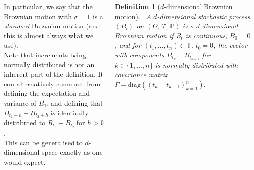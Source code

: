 \documentclass{tikzposter} %
\newtheorem{lemma}[theorem]{Lemma}
\newtheorem{definition}{Definition}
\begin{document}
\begin{columns}
{    In particular, we say that the Brownian motion with $\sigma = 1$ is a \emph{standard} Brownian motion (and this is almost always what we use). \\

    Note that increments being normally distributed is not an inherent part of the definition. It can alternatively come out from defining the expectation and variance of $B_{1}$, and defining that $B_{t_{1}+h} - B_{t_{2}+h}$ is identically distributed to $B_{t_{1}} - B_{t_{2}}$ for $h > 0$. \\

    This can be generalised to $d$-dimensional space exactly as one would expect. \\

    \begin{definition}[$d$-dimensional Brownian motion]
    \ A $d$-dimensional stochastic process $(B_{t})$ on $(\Omega, \mathcal{F}, \mathbb{P})$ is a $d$-dimensional Brownian motion if $B_{t}$ is continuous, $B_{0} = 0$, and for $(t_{1},\dots,t_{n}) \in \mathbb{T}$, $t_{0} = 0$, the vector with components $B_{t_{k}} - B_{t_{k-1}}$ for $k \in \{1,\dots,n\}$ is normally distributed with covariance matrix $\Gamma = \mathrm{diag}((t_{k}-t_{k-1})_{k = 1}^{n})$.
    \end{definition}
    \hphantom{}

    }
\end{columns}
\end{document}
